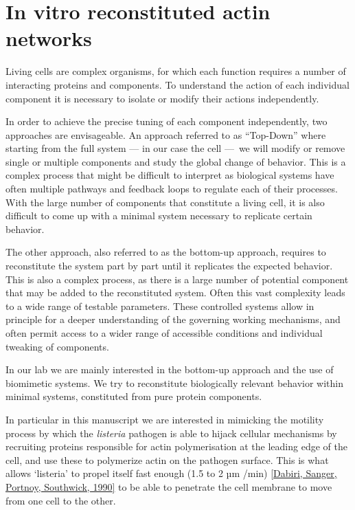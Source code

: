 \documentclass[A4paperpaper,11pt,english]{sphinxmanual}
\begin{document}
\section{In vitro reconstituted actin networks}
\label{index-latex:in-vitro-reconstituted-actin-networks}
Living cells are complex organisms, for which each function requires a number
of interacting proteins and components. To understand the action of each
individual component it is necessary to isolate or modify their actions
independently.

In order to achieve the precise tuning of each component independently, two
approaches are envisageable. An approach referred to  as ``Top-Down'' where
starting from the full system — in our case the cell — we will modify or remove
single or multiple components and study the global change of behavior. This is a complex
process that might be difficult to interpret as biological systems have often
multiple pathways and feedback loops to regulate each of their processes. With the
large number of components that constitute a living cell, it is also
difficult to come up with a minimal system necessary to replicate certain behavior.

The other approach, also referred to as the bottom-up approach, requires to
reconstitute the system part by part until it replicates the expected
behavior. This is also a complex process, as there is a large number of potential component
that may be added to the reconstituted system. Often this vast complexity
leads to a wide range of testable parameters.
These controlled systems allow in principle for a deeper understanding of the governing
working mechanisms, and often permit access to a wider range of accessible
conditions and individual tweaking of components.

In our lab we are mainly interested in the bottom-up approach and the use of
biomimetic systems. We try to reconstitute biologically relevant behavior within
minimal systems,  constituted from pure protein components.

In particular in this manuscript we are interested in mimicking the motility process
by which the \emph{listeria} pathogen is able to hijack cellular mechanisms by recruiting proteins
responsible for actin polymerisation at the leading edge of the cell, and use
these to polymerize actin on the pathogen surface. This is what allows `listeria' to
propel itself fast enough (1.5 to 2 µm /min) {\hyperref[index-latex:dabiri1990]{{[}Dabiri, Sanger, Portnoy, Southwick,  1990{]}}} to be able to
penetrate the cell membrane to move from one cell to the other.
\end{document}
